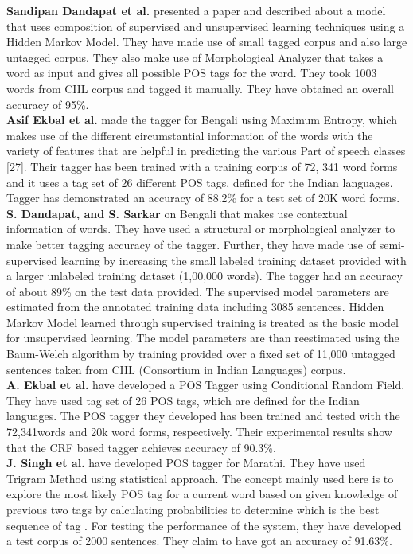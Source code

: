 \documentclass[12pt,a4paper,oneside]{memoir}
\begin{document}
\textbf{Sandipan Dandapat et al.} presented a paper and described about a model that uses composition of supervised and unsupervised learning techniques using a Hidden Markov Model. They have made use of small tagged corpus and also large untagged corpus. They also make use of Morphological Analyzer that takes a word as input and gives all possible POS tags for the word. They took 1003 words from CIIL corpus and tagged it manually. They have obtained an overall accuracy of 95\%.\\
 
\textbf{Asif Ekbal et al.} made the tagger for Bengali using Maximum Entropy, which makes use of the different circumstantial information of the words with the variety of features that are helpful in predicting the various Part of speech classes [27]. Their tagger has been trained with a training corpus of 72, 341 word forms and it uses a tag set of 26 different POS tags, defined for the Indian languages. Tagger has demonstrated an accuracy of 88.2\% for a test set of 20K word forms.\\
 
\textbf{S. Dandapat, and S. Sarkar} on Bengali that makes use contextual information of words. They have used a structural or morphological analyzer to make better tagging accuracy of the tagger. Further, they have made use of semi-supervised learning by increasing the small labeled training dataset provided with a larger unlabeled training dataset (1,00,000 words). The tagger had an accuracy of about 89\% on the test data provided. The supervised model parameters are estimated from the annotated training data including 3085 sentences. Hidden Markov Model learned through supervised training is treated as the basic model for unsupervised learning. The model parameters are than reestimated using the Baum-Welch algorithm by training provided over a fixed set of 11,000 untagged sentences taken from CIIL (Consortium in Indian Languages) corpus. \\

\textbf{A. Ekbal et al.} have developed a POS Tagger using Conditional Random Field. They have used tag set of 26 POS tags, which are defined for the Indian languages. The POS tagger they developed has been trained and tested with the 72,341words and 20k word forms, respectively. Their experimental results show that the CRF based tagger achieves accuracy of 90.3\%.\\

\textbf{J. Singh et al.} have developed POS tagger for Marathi. They have used Trigram Method using statistical approach. The concept mainly used here is to explore the most likely POS tag for a current word based on given knowledge of previous two tags by calculating probabilities to determine which is the best sequence of tag . For testing the performance of the system, they have developed a test corpus of 2000 sentences. They claim to have got an accuracy of 91.63\%.\\
 
\end{document}
